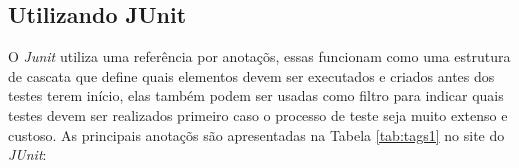 




 








\subsection{Utilizando JUnit}

O \textit{Junit} utiliza uma referência por anotaçõs, essas funcionam como uma estrutura de cascata que define quais elementos devem ser executados e criados antes dos testes terem início, elas também podem ser usadas como filtro para indicar quais testes devem ser realizados primeiro caso o processo de teste seja muito extenso e custoso. 
As principais anotaçõs são apresentadas na Tabela \ref{tab:tags1} no site do \textit{JUnit}:


